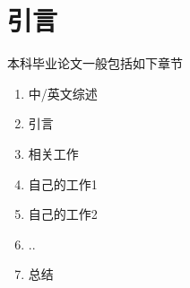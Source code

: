 \chapter{引言}\label{chap1}

本科毕业论文一般包括如下章节

\begin{enumerate}

\item 中/英文综述
\item 引言
\item 相关工作
\item 自己的工作1
\item 自己的工作2
\item ..
\item 总结

\end{enumerate}


